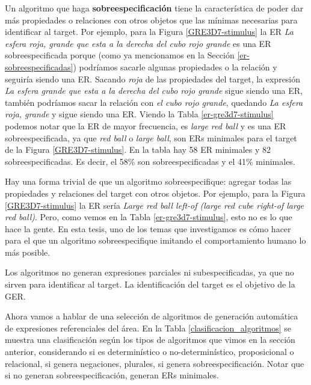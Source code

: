 Un algoritmo que haga {\bf sobreespecificaci\'on} tiene la caracter\'istica de poder dar m\'as propiedades o relaciones con otros objetos que las m\'inimas necesarias para identificar al target. Por ejemplo, para la Figura \ref{GRE3D7-stimulus} la ER {\it La esfera roja, grande que esta a la derecha del cubo rojo grande} es una ER sobreespecificada porque (como ya mencionamos en la Secci\'on \ref{er-sobreespecificadas}) podr\'iamos sacarle algunas propiedades o la relaci\'on y seguir\'ia siendo una ER. Sacando {\it roja} de las propiedades del target, la expresi\'on {\it La esfera grande que esta a la derecha del cubo rojo grande} sigue siendo una ER, tambi\'en podr\'iamos sacar la relaci\'on con {\it el cubo rojo grande}, quedando {\it La esfera roja, grande} y sigue siendo una ER. Viendo la Tabla \ref{er-gre3d7-stimulus} podemos notar que la ER de mayor frecuencia, es {\it large red ball} y es una ER sobreespecificada, ya que {\it red ball} o {\it large ball}, son ERs minimales para el target de la Figura \ref{GRE3D7-stimulus}. En la tabla hay 58 ER minimales y 82 sobreespecificadas. Es decir, el 58\% son sobreespecificadas y el 41\% minimales.

Hay una forma trivial de que un algoritmo sobreespecifique: agregar todas las propiedades y relaciones del target con otros objetos. Por ejemplo, para la Figura \ref{GRE3D7-stimulus} la ER ser\'ia {\it Large red ball left-of (large red cube right-of large red ball)}. Pero, como vemos en la Tabla \ref{er-gre3d7-stimulus}, esto no es lo que hace la gente. En esta tesis, uno de los temas que investigamos es c\'omo hacer para el que un algoritmo sobreespecifique imitando el comportamiento humano lo m\'as posible. 

Los algoritmos no generan expresiones parciales ni subespecificadas, ya que no sirven para identificar al target. La identificaci\'on del target es el objetivo de la GER.





Ahora vamos a hablar de una selecci\'on de algoritmos de generaci\'on autom\'atica de expresiones referenciales del \'area. En la Tabla \ref{clasificacion_algoritmos} se muestra una clasificaci\'on seg\'un los tipos de algoritmos que vimos en la secci\'on anterior, considerando si es determin\'istico o no-determin\'istico, proposicional o relacional, si genera negaciones, plurales, si genera sobreespecificaci\'on. Notar que si no generan sobreespecificaci\'on, generan ERs minimales.

